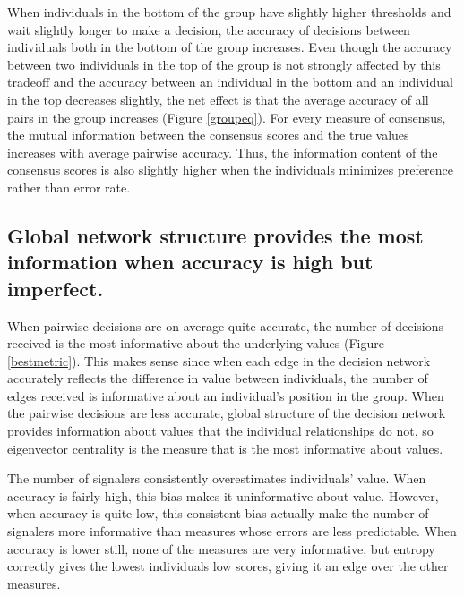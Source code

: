\documentclass{article}
\begin{document}
When individuals in the bottom of the group have slightly higher thresholds and wait slightly longer to make a decision, the accuracy of decisions between individuals both in the bottom of the group increases.  Even though the accuracy between two individuals in the top of the group is not strongly affected by this tradeoff and the accuracy between an individual in the bottom and an individual in the top decreases slightly, the net effect is that the average accuracy of all pairs in the group increases (Figure \ref{groupeq}).  For every measure of consensus, the mutual information between the consensus scores and the true values increases with average pairwise accuracy.  Thus, the information content of the consensus scores is also slightly higher when the individuals minimizes preference rather than error rate.

\subsection{Global network structure provides the most information when accuracy is high but imperfect. }
When pairwise decisions are on average quite accurate, the number of decisions received is the most informative about the underlying values (Figure \ref{bestmetric}).  This makes sense since when each edge in the decision network accurately reflects the difference in value between individuals, the number of edges received is informative about an individual's position in the group.  When the pairwise decisions are less accurate, global structure of the decision network provides information about values that the individual relationships do not, so eigenvector centrality is the measure that is the most informative about values.  

The number of signalers consistently overestimates individuals' value.  When accuracy is fairly high, this bias makes it uninformative about value.  However, when accuracy is quite low, this consistent bias actually make the number of signalers more informative than measures whose errors are less predictable. When accuracy is lower still, none of the measures are very informative, but entropy correctly gives the lowest individuals low scores, giving it an edge over the other measures.
\end{document}
